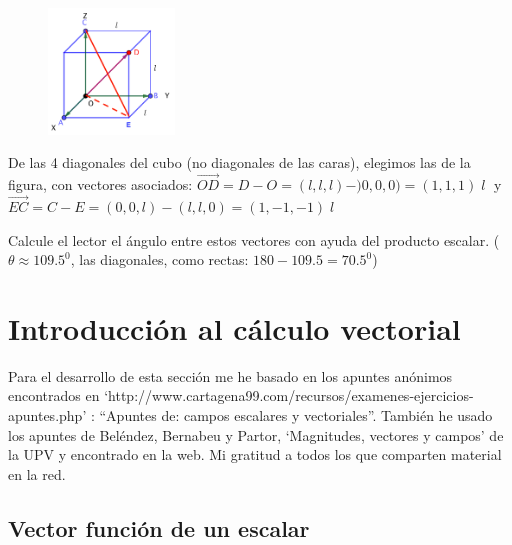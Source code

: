 \begin{proofw}\renewcommand{\qedsymbol}{$\diamond$}
\begin{multicols}{2}	
	\begin{figure}[H]
	\centering
	\includegraphics[width=0.30\textwidth]{imagenes/imagenes10/T10IM16.png}
	\end{figure}
De las 4 diagonales del cubo (no diagonales de las caras), elegimos las de la figura, con vectores asociados: $\overrightarrow{OD}=D-O=(l,l,l)-)0,0,0)=(1,1,1)\; l\; $ y $\overrightarrow{EC}=C-E=(0,0,l)-(l,l,0)=(1,-1,-1)\; l$

Calcule el lector el ángulo entre estos vectores con ayuda del producto escalar. \scriptsize{( $\theta \approx 109.5^0$, las diagonales, como rectas: $180-109.5=	70.5^0$)}

\end{multicols}
\end{proofw}



\section{Introducción al cálculo vectorial}

Para el desarrollo de esta sección me he basado en los apuntes anónimos encontrados en `http://www.cartagena99.com/recursos/examenes-ejercicios-apuntes.php' : ``Apuntes de: campos escalares y vectoriales''. También he usado los apuntes de Beléndez, Bernabeu y Partor, `Magnitudes, vectores y campos' de la UPV y encontrado en la web. Mi gratitud a todos los que comparten material en la red.

\subsection{Vector función de un escalar}

